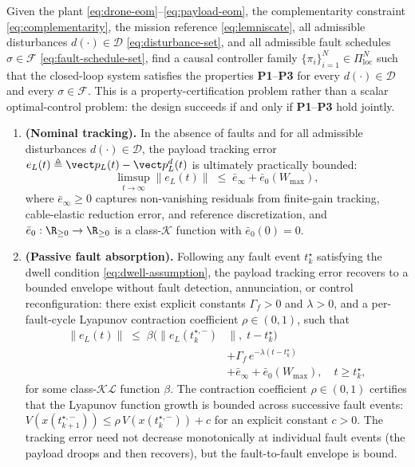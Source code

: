\begin{definition}
\label{def:problem}
Given the plant
\eqref{eq:drone-eom}--\eqref{eq:payload-eom}, the complementarity constraint \eqref{eq:complementarity}, the mission reference \eqref{eq:lemniscate}, all admissible disturbances $d(\cdot) \in \mathcal{D}$ \eqref{eq:disturbance-set}, and all admissible fault schedules $\sigma \in \mathcal{F}$ \eqref{eq:fault-schedule-set}, find a causal controller family $\{\pi_i\}_{i=1}^N \in \Pi_{\mathrm{loc}}^N$ such that the closed-loop system satisfies the properties \textbf{P1}--\textbf{P3} for every $d(\cdot) \in \mathcal{D}$ and every $\sigma \in \mathcal{F}$. This is a property-certification problem rather than a scalar optimal-control problem: the design succeeds if and only if \textbf{P1}--\textbf{P3} hold jointly.

\begin{enumerate}[label=\textbf{P\arabic*},leftmargin=2.0em]
      \item \textbf{(Nominal tracking).}  In the absence of faults and for all admissible disturbances $d(\cdot) \in \mathcal{D}$, the payload tracking error $e_L(t) \triangleq \vect p_L(t) - \vect p_L^d(t)$ is  ultimately practically bounded:
        \begin{equation}
          \limsup_{t\to\infty}\|e_L(t)\|
            \;\le\; \bar{e}_{\infty} + \bar{e}_0(W_{\max}),
          \label{eq:nominal-practical-bound}
        \end{equation}
     where $\bar{e}_{\infty} \ge 0$ captures non-vanishing residuals from finite-gain tracking, cable-elastic reduction error, and reference discretization, and $\bar{e}_0: \R_{\ge 0} \to \R_{\ge 0}$ is a class-$\mathcal{K}$ function with $\bar{e}_0(0) = 0$.

    \item \textbf{(Passive fault absorption).}  Following any fault event $t_k^\star$ satisfying the  dwell condition \eqref{eq:dwell-assumption}, the payload  tracking error recovers to a bounded envelope without fault detection, annunciation, or control reconfiguration: there  exist explicit constants $\Gamma_f > 0$ and $\lambda > 0$,  and a per-fault-cycle Lyapunov contraction coefficient $\rho \in (0,1)$, such that
        \begin{align}
        \label{eq:recovery-bound}
          \|e_L(t)\| \;\le\;
            \beta\!\bigl(\|e_L(t_k^{\star,-})&\|,\; t - t_k^\star\bigr)\\
            &+ \Gamma_f\,e^{-\lambda(t - t_k^\star)}\nonumber\\
            &+ \bar{e}_{\infty} + \bar{e}_0(W_{\max}),
          \quad t \ge t_k^\star,\nonumber
        \end{align}
    for some class-$\mathcal{KL}$ function $\beta$. The contraction coefficient $\rho \in (0,1)$ certifies that the  Lyapunov function growth is bounded across successive fault events: $V(x(t_{k+1}^{\star,-})) \le \rho\, V(x(t_k^{\star,-})) + c$ for an explicit constant $c > 0$. The tracking error need not decrease monotonically at individual fault events (the payload droops and then recovers), but the fault-to-fault envelope is bound.


\end{enumerate}
\end{definition}
